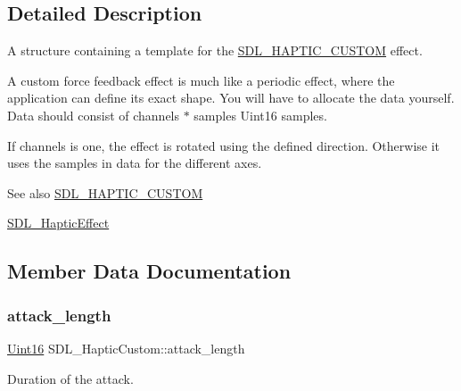 \subsection{Detailed Description}
A structure containing a template for the \hyperlink{_s_d_l__haptic_8h_a8a18c4de1076ac9bebd718329d16db29}{S\+D\+L\+\_\+\+H\+A\+P\+T\+I\+C\+\_\+\+C\+U\+S\+T\+OM} effect. 

A custom force feedback effect is much like a periodic effect, where the application can define its exact shape. You will have to allocate the data yourself. Data should consist of channels $\ast$ samples Uint16 samples.

If channels is one, the effect is rotated using the defined direction. Otherwise it uses the samples in data for the different axes.

\begin{DoxySeeAlso}{See also}
\hyperlink{_s_d_l__haptic_8h_a8a18c4de1076ac9bebd718329d16db29}{S\+D\+L\+\_\+\+H\+A\+P\+T\+I\+C\+\_\+\+C\+U\+S\+T\+OM} 

\hyperlink{union_s_d_l___haptic_effect}{S\+D\+L\+\_\+\+Haptic\+Effect} 
\end{DoxySeeAlso}


\subsection{Member Data Documentation}
\mbox{\label{struct_s_d_l___haptic_custom_a018b35d89398c26e10d1fb4315d1dda1}} 
\subsubsection{\texorpdfstring{attack\+\_\+length}{attack\_length}}
{\footnotesize\ttfamily \hyperlink{_s_d_l__stdinc_8h_a31fcc0a076c9068668173ee26d33e42b}{Uint16} S\+D\+L\+\_\+\+Haptic\+Custom\+::attack\+\_\+length}

Duration of the attack. \mbox{\label{struct_s_d_l___haptic_custom_ad6e394e3775372af3eb9e02823987405}} 
